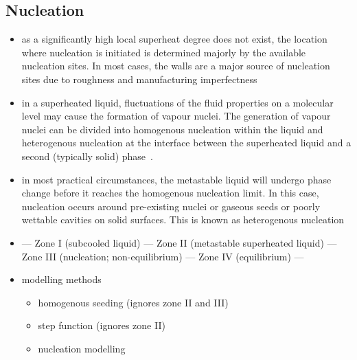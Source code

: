 \documentclass[11pt]{article}
\begin{document}
\subsection{Nucleation}
\begin{itemize}
	\item as a significantly high local superheat degree does not exist, the location where nucleation is initiated is determined majorly by the available nucleation sites. In most cases, the walls are a major source of nucleation sites due to roughness and manufacturing imperfectness~\cite{liaoFlashingEvaporationDifferent2013}
	\item in a superheated liquid, fluctuations of the fluid properties on a molecular level may cause the formation of vapour nuclei. The generation of vapour nuclei can be divided into homogenous nucleation within the liquid and heterogenous nucleation at the interface between the superheated liquid and a second (typically solid) phase~\cite{Gartner2024-zh}.
	\item in most practical circumstances, the metastable liquid will undergo phase change before it reaches the homogenous nucleation limit. In this case, nucleation occurs around pre-existing nuclei or gaseous seeds or poorly wettable cavities on solid surfaces. This is known as heterogenous nucleation~\cite{liaoComputationalModellingFlash2017} 
	\item \scriptsize--- Zone I (subcooled liquid) --- Zone II (metastable superheated liquid) --- Zone III (nucleation; non-equilibrium) --- Zone IV (equilibrium) --- \normalsize
	\item modelling methods \begin{itemize}
		\item homogenous seeding (ignores zone II and III)
		\item step function (ignores zone II)
		\item nucleation modelling
	\end{itemize} 
\end{itemize}
\end{document}
